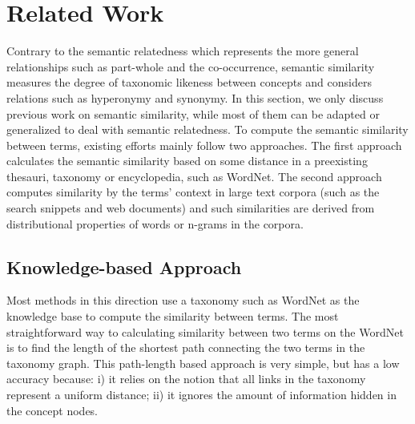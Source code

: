 \section{Related Work}
\label{sec:related}

Contrary to the semantic relatedness which represents the more general relationships
such as part-whole and the co-occurrence, semantic similarity measures the
degree of taxonomic likeness between concepts and considers relations such as
hyperonymy and synonymy. In this section, we only discuss previous work on
semantic similarity, while most of them can be adapted or generalized to
deal with semantic relatedness.
To compute the semantic similarity between terms, existing efforts mainly
follow two approaches. The first approach calculates the semantic similarity
based on some distance in a preexisting thesauri, taxonomy or encyclopedia, such as WordNet. The second approach computes similarity by the terms' context in
large text corpora (such as the search snippets and web documents)
and such similarities are derived from distributional properties of
words or n-grams in the corpora.

\subsection{Knowledge-based Approach}

Most methods in this direction use a taxonomy such as WordNet as the
knowledge base to compute the similarity between terms.
The most straightforward way to calculating similarity between two
terms on the WordNet is to find the length of the shortest path
connecting the two terms in the taxonomy graph\cite{Rada:1989}.
This path-length based approach is very simple, but has a low accuracy
because: i) it relies on the notion that all links in the taxonomy represent
a uniform distance; ii) it ignores the amount of information hidden in the concept nodes.


